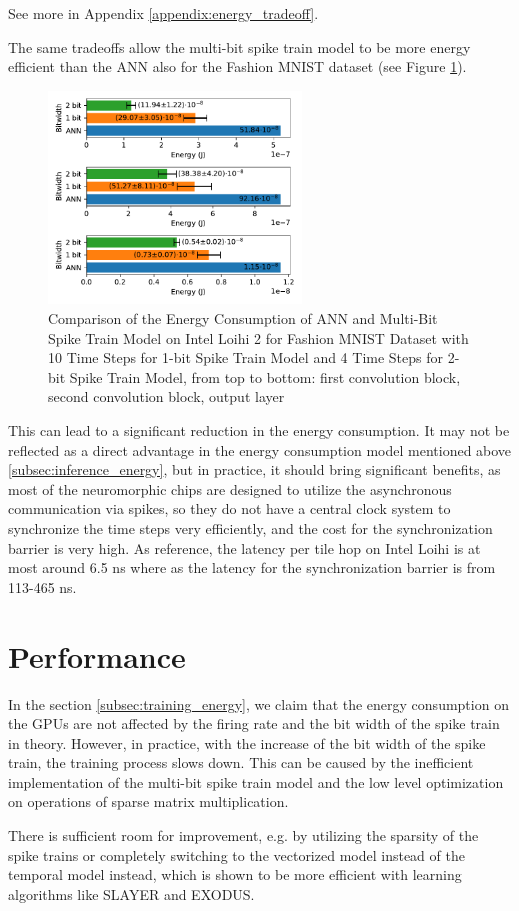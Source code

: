         See more in Appendix \ref{appendix:energy_tradeoff}.

        The same tradeoffs allow the multi-bit spike train model to be more energy efficient than the ANN also for the Fashion MNIST dataset (see Figure \ref{fig:energy_ann_vs_snn_timesteps}).
        \begin{figure}[H]
            \centering
            \includegraphics[width=0.6\textwidth]{../timesteps/FashionMNIST/plots/fashionmnist_energy_ann_vs_snn.pdf}
            \caption{Comparison of the Energy Consumption of ANN and Multi-Bit Spike Train Model on Intel Loihi 2 for Fashion MNIST Dataset with 10 Time Steps for 1-bit Spike Train Model and 4 Time Steps for 2-bit Spike Train Model, from top to bottom: first convolution block, second convolution block, output layer}
            \label{fig:energy_ann_vs_snn_timesteps}
        \end{figure}

        This can lead to a significant reduction in the energy consumption. It may not be reflected as a direct advantage in the energy consumption model mentioned above \ref{subsec:inference_energy}, but in practice, it should bring significant benefits, as most of the neuromorphic chips are designed to utilize the asynchronous communication via spikes, so they do not have a central clock system to synchronize the time steps very efficiently, and the cost for the synchronization barrier is very high. As reference, the latency per tile hop on Intel Loihi is at most around 6.5 ns where as the latency for the synchronization barrier is from 113-465 ns. 

\section{Performance}
\label{sec:performance}
    In the section \ref{subsec:training_energy}, we claim that the energy consumption on the GPUs are not affected by the firing rate and the bit width of the spike train in theory. However, in practice, with the increase of the bit width of the spike train, the training process slows down. This can be caused by the inefficient implementation of the multi-bit spike train model and the low level optimization on operations of sparse matrix multiplication. 

    There is sufficient room for improvement, e.g. by utilizing the sparsity of the spike trains or completely switching to the vectorized model instead of the temporal model instead, which is shown to be more efficient with learning algorithms like SLAYER and EXODUS. 
